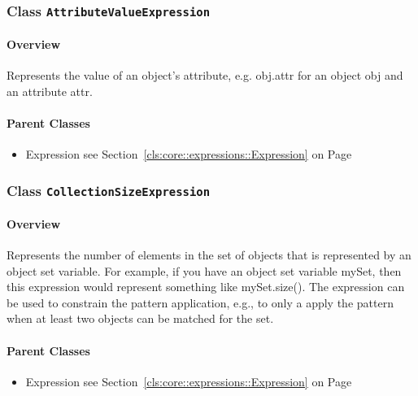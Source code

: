 \subsubsection{\Large{Class \bfseries \texttt{AttributeValueExpression}\normalfont}}
\label{cls:storydiagrams::patterns::expressions::AttributeValueExpression} 
\paragraph{Overview}

	
			
Represents the value of an object's attribute, e.g. obj.attr for an object obj and an attribute attr.	
		
	



\paragraph{Parent Classes}
\begin{itemize}
\item Expression see Section~\ref{cls:core::expressions::Expression} on Page~\pageref{cls:core::expressions::Expression}\end{itemize}
\subsubsection{\Large{Class \bfseries \texttt{CollectionSizeExpression}\normalfont}}
\label{cls:storydiagrams::patterns::expressions::CollectionSizeExpression} 
\paragraph{Overview}

	
			
Represents the number of elements in the set of objects that is represented by an object set variable. For example, if you have an object set variable mySet, then this expression would represent something like mySet.size(). The expression can be used to constrain the pattern application, e.g., to only a apply the pattern when at least two objects can be matched for the set.	
		
	



\paragraph{Parent Classes}
\begin{itemize}
\item Expression see Section~\ref{cls:core::expressions::Expression} on Page~\pageref{cls:core::expressions::Expression}\end{itemize}

